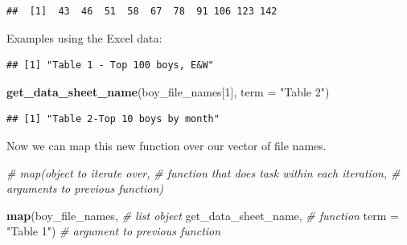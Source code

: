\documentclass[]{book}
\newenvironment{Shaded}{\begin{snugshade}}{\end{snugshade}}
\newcommand{\CommentTok}[1]{\textcolor[rgb]{0.56,0.35,0.01}{\textit{#1}}}
\newcommand{\ControlFlowTok}[1]{\textcolor[rgb]{0.13,0.29,0.53}{\textbf{#1}}}
\newcommand{\DataTypeTok}[1]{\textcolor[rgb]{0.13,0.29,0.53}{#1}}
\newcommand{\DecValTok}[1]{\textcolor[rgb]{0.00,0.00,0.81}{#1}}
\newcommand{\KeywordTok}[1]{\textcolor[rgb]{0.13,0.29,0.53}{\textbf{#1}}}
\newcommand{\NormalTok}[1]{#1}
\newcommand{\OperatorTok}[1]{\textcolor[rgb]{0.81,0.36,0.00}{\textbf{#1}}}
\newcommand{\StringTok}[1]{\textcolor[rgb]{0.31,0.60,0.02}{#1}}
\begin{document}
\begin{verbatim}
##  [1]  43  46  51  58  67  78  91 106 123 142
\end{verbatim}

Examples using the Excel data:

\begin{Shaded}
\end{Shaded}

\begin{verbatim}
## [1] "Table 1 - Top 100 boys, E&W"
\end{verbatim}

\begin{Shaded}
\begin{Highlighting}[]
\KeywordTok{get_data_sheet_name}\NormalTok{(boy_file_names[}\DecValTok{1}\NormalTok{], }\DataTypeTok{term =} \StringTok{"Table 2"}\NormalTok{)}
\end{Highlighting}
\end{Shaded}

\begin{verbatim}
## [1] "Table 2-Top 10 boys by month"
\end{verbatim}

Now we can map this new function over our vector of file names.

\begin{Shaded}
\begin{Highlighting}[]
\CommentTok{# map(object to iterate over, }
\CommentTok{#     function that does task within each iteration, }
\CommentTok{#     arguments to previous function)}
 
\KeywordTok{map}\NormalTok{(boy_file_names,      }\CommentTok{# list object}
\NormalTok{    get_data_sheet_name, }\CommentTok{# function}
    \DataTypeTok{term =} \StringTok{"Table 1"}\NormalTok{)    }\CommentTok{# argument to previous function}
\end{Highlighting}
\end{Shaded}
\end{document}
